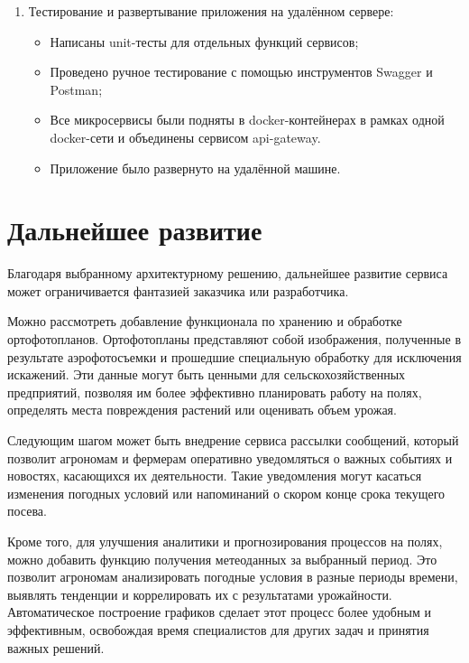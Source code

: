 \begin{enumerate}
    \item Тестирование и развертывание приложения на удалённом сервере:
    \begin{itemize}
    \item Написаны unit-тесты для отдельных функций сервисов;
    \item Проведено ручное тестирование с помощью инструментов Swagger и Postman;
    \item Все микросервисы были подняты в docker-контейнерах в рамках одной docker-сети и объединены сервисом api-gateway.
    \item Приложение было развернуто на удалённой машине.
    \end{itemize}
    

    \end{enumerate}
    



\section{Дальнейшее развитие}

Благодаря выбранному архитектурному решению, дальнейшее развитие сервиса может ограничивается фантазией заказчика или разработчика.

Можно рассмотреть добавление функционала по хранению и обработке ортофотопланов. Ортофотопланы представляют собой изображения, полученные в результате аэрофотосъемки и прошедшие специальную обработку для исключения искажений. Эти данные могут быть ценными для сельскохозяйственных предприятий, позволяя им более эффективно планировать работу на полях, определять места повреждения растений или оценивать объем урожая.

Следующим шагом может быть внедрение сервиса рассылки сообщений, который позволит агрономам и фермерам оперативно уведомляться о важных событиях и новостях, касающихся их деятельности. Такие уведомления могут касаться изменения погодных условий или напоминаний о скором конце срока текущего посева.

Кроме того, для улучшения аналитики и прогнозирования процессов на полях, можно добавить функцию получения метеоданных за выбранный период. Это позволит агрономам анализировать погодные условия в разные периоды времени, выявлять тенденции и коррелировать их с результатами урожайности. Автоматическое построение графиков сделает этот процесс более удобным и эффективным, освобождая время специалистов для других задач и принятия важных решений.